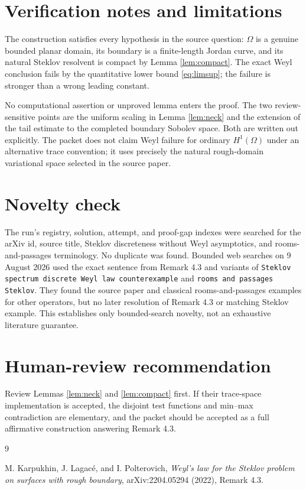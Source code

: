 \documentclass[11pt]{article}
\newcommand{\Om}{\Omega}
\begin{document}
\section{Verification notes and limitations}

The construction satisfies every hypothesis in the source question:
$\Om$ is a genuine bounded planar domain, its boundary is a finite-length
Jordan curve, and its natural Steklov resolvent is compact by
Lemma \ref{lem:compact}.  The exact Weyl conclusion fails by the quantitative
lower bound \eqref{eq:limsup}; the failure is stronger than a wrong leading
constant.

No computational assertion or unproved lemma enters the proof.  The two
review-sensitive points are the uniform scaling in Lemma \ref{lem:neck} and
the extension of the tail estimate to the completed boundary Sobolev space.
Both are written out explicitly.  The packet does not claim Weyl failure for
ordinary $H^1(\Om)$ under an alternative trace convention; it uses precisely
the natural rough-domain variational space selected in the source paper.

\section{Novelty check}

The run's registry, solution, attempt, and proof-gap indexes were searched for
the arXiv id, source title, Steklov discreteness without Weyl asymptotics, and
rooms-and-passages terminology.  No duplicate was found.  Bounded web searches
on 9 August 2026 used the exact sentence from Remark 4.3 and variants of
\texttt{Steklov spectrum discrete Weyl law counterexample} and
\texttt{rooms and passages Steklov}.  They found the source paper and classical
rooms-and-passages examples for other operators, but no later resolution of
Remark 4.3 or matching Steklov example.  This establishes only bounded-search
novelty, not an exhaustive literature guarantee.

\section{Human-review recommendation}

Review Lemmas \ref{lem:neck} and \ref{lem:compact} first.  If their trace-space
implementation is accepted, the disjoint test functions and min--max
contradiction are elementary, and the packet should be accepted as a full
affirmative construction answering Remark 4.3.

\begin{thebibliography}{9}

M. Karpukhin, J. Lagac\'e, and I. Polterovich,
\emph{Weyl's law for the Steklov problem on surfaces with rough boundary},
arXiv:2204.05294 (2022), Remark 4.3.

\end{thebibliography}
\end{document}
